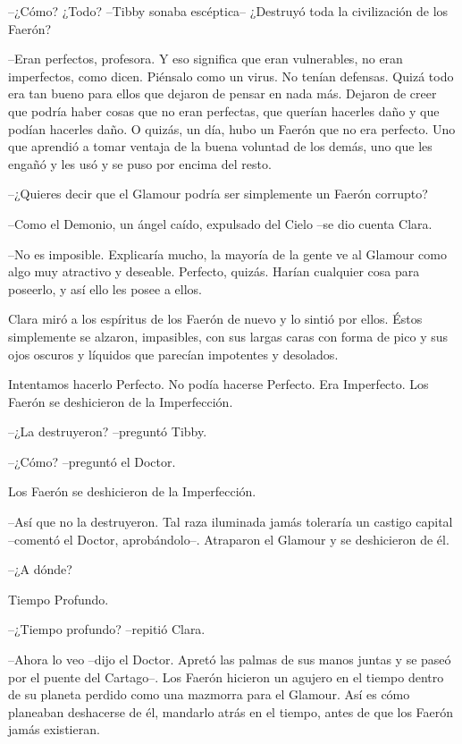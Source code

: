 {--¿Cómo? ¿Todo? --Tibby sonaba escéptica-- ¿Destruyó toda la
civilización de los Faerón?}

{--Eran perfectos, profesora. Y eso significa que eran vulnerables, no
 eran imperfectos, como dicen. Piénsalo como un virus. No tenían
 defensas. Quizá todo era tan bueno para ellos que dejaron de pensar en
 nada más. Dejaron de creer que podría haber cosas que no eran perfectas,
 que querían hacerles daño y que podían hacerles daño. O quizás, un día,
 hubo un Faerón que no era perfecto. Uno que aprendió a tomar ventaja de
 la buena voluntad de los demás, uno que les engañó y les usó y se puso
por encima del resto.}

{--¿Quieres decir que el Glamour podría ser simplemente un Faerón
corrupto?}

{--Como el Demonio, un ángel caído, expulsado del Cielo --se dio cuenta
Clara.}

{--No es imposible. Explicaría mucho, la mayoría de la gente ve al
 Glamour como algo muy atractivo y deseable. Perfecto, quizás. Harían
cualquier cosa para poseerlo, y así ello les posee a ellos.}

{Clara miró a los espíritus de los Faerón de nuevo y lo sintió por ellos.
 Éstos simplemente se alzaron, impasibles, con sus largas caras con forma
 de pico y sus ojos oscuros y líquidos que parecían impotentes y
desolados.}

{Intentamos hacerlo Perfecto. No podía hacerse Perfecto. Era Imperfecto.
Los Faerón se deshicieron de la Imperfección.}

{--¿La destruyeron? --preguntó Tibby.}

{--¿Cómo? --preguntó el Doctor.}

{Los Faerón se deshicieron de la Imperfección.}

{--Así que no la destruyeron. Tal raza iluminada jamás toleraría un
 castigo capital --comentó el Doctor, aprobándolo--. Atraparon el Glamour
y se deshicieron de él.}

{--¿A dónde?}

{Tiempo Profundo.}

{--¿Tiempo profundo? --repitió Clara.}

{--Ahora lo veo --dijo el Doctor. Apretó las palmas de sus manos juntas y
 se paseó por el puente del Cartago--. Los Faerón hicieron un agujero en
 el tiempo dentro de su planeta perdido como una mazmorra para el
 Glamour. Así es cómo planeaban deshacerse de él, mandarlo atrás en el
tiempo, antes de que los Faerón jamás existieran.}

